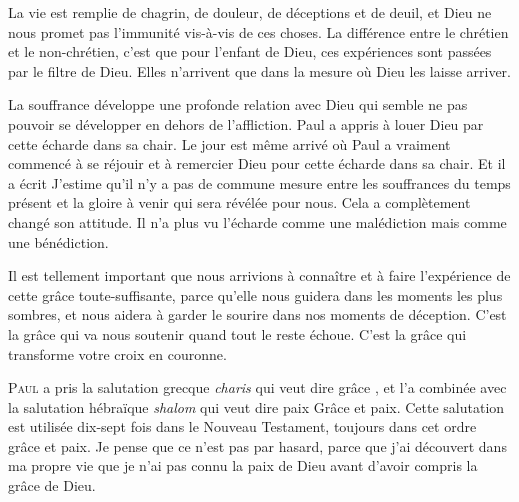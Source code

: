 La vie est remplie de chagrin, de douleur, de déceptions et de deuil,
 et Dieu ne nous promet pas l'immunité vis-à-vis de ces choses.
 La différence entre le chrétien et le non-chrétien,
 c'est que pour l'enfant de Dieu, ces expériences sont passées
 par le filtre de Dieu. Elles n'arrivent que dans la mesure
 où Dieu les laisse arriver.


La souffrance développe une profonde relation avec Dieu qui semble
 ne pas pouvoir se développer en dehors de l'affliction.
 Paul a appris à louer Dieu par cette écharde dans sa chair.
 Le jour est même arrivé où Paul a vraiment commencé à se réjouir
 et à remercier Dieu pour cette écharde dans sa chair.
 Et il a écrit\frcolon {}
 \Og J'estime qu'il n'y a pas de commune mesure entre les souffrances
 du temps présent et la gloire à venir qui sera révélée pour nous. \Fg{}
 Cela a complètement changé son attitude. Il n'a plus vu l'écharde
 comme une malédiction mais comme une bénédiction.

Il est tellement important que nous arrivions à connaître
 et à faire l'expérience de cette grâce toute-suffisante,
 parce qu'elle nous guidera dans les moments les plus sombres,
 et nous aidera à garder le sourire dans nos moments de déception.
 C'est la grâce qui va nous soutenir quand tout le reste échoue.
 C'est la grâce qui transforme votre croix en couronne.

\dvrule






\lettrine{P}{aul} a pris la salutation grecque \emph{charis}
 qui veut dire \Og grâce \Fg{}, et l'a combinée avec la salutation
 hébraïque \emph{shalom} qui veut dire \Og paix \Fg{}\frcolon {}
 \Og Grâce et paix. \Fg{}
 Cette salutation est utilisée dix-sept fois dans le Nouveau Testament,
 toujours dans cet ordre\frcolon {} \Og grâce et paix. \Fg{}
 Je pense que ce n'est pas par hasard, parce que j'ai découvert
 dans ma propre vie que je n'ai pas connu la paix de Dieu
 avant d'avoir compris la grâce de Dieu.

